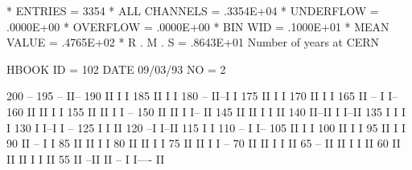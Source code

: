 \begin{Listing}
 * ENTRIES =       3354      * ALL CHANNELS =  .3354E+04      * UNDERFLOW =  .0000E+00      * OVERFLOW =  .0000E+00
 * BIN WID =  .1000E+01      * MEAN VALUE   =  .4765E+02      * R . M . S =  .8643E+01
\newpage
 Number of years at CERN                                                         
 
 HBOOK     ID =       102                                        DATE  09/03/93              NO =     2
 
      200                                                 --
      195                                             --  II--
      190                                             II  I  I
      185                                             II  I  I
      180                                     --      II--I  I
      175                                     II      I      I
      170                                     II      I      I
      165                                     II  --  I      I--
      160                                     II  II  I        I
      155                                     II  II  I        I    --
      150                                     II  II  I        I--  II
      145                                     II  II  I          I  II
      140                                     II--II  I          I--II
      135                                     I    I  I              I
      130                                     I    I--I              I  --
      125                                     I                      I  II
      120                                   --I                      I--II
      115                                   I                            I
      110                 --                I                            I--
      105                 II                I                              I
      100                 II                I                              I
       95                 II                I                              I
       90                 II    --          I                              I
       85                 II    II          I                              I
       80                 II    II          I                              I
       75                 II    II          I                              I      --
       70                 II    II          I                              I      II
       65         --      II    II          I                              I      II
       60         II      II    II          I                              I      II
       55         II    --II    II    --    I                              I----  II

\end{Listing}

